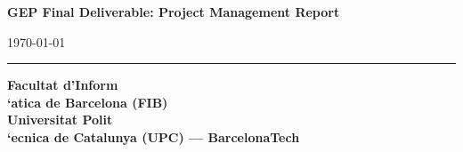 \documentclass[12pt, a4paper, twoside]{report}
\newcommand{\DocumentDate}{\today}
\begin{document}
\begin{titlepage}
  \begin{center}
    {\normalsize\bfseries GEP Final Deliverable: Project Management Report\par
      \vspace{0.3cm}
      \DocumentDate\par
    }
  \end{center}

  \vfill

  {\color{upcblue}\noindent\rule{\linewidth}{0.6pt}}
  \vspace{0.3cm}

  \begin{center}
    {\normalsize\bfseries
      Facultat d'Inform\\`atica de Barcelona (FIB)\\[2pt]
      Universitat Polit\\`ecnica de Catalunya (UPC) --- BarcelonaTech\par}
  \end{center}

  \restoregeometry
\end{titlepage}

\tableofcontents
\listoffigures
\listoftables

\DeclareRobustCommand{\loesource}[1]{\newline \textit{\small #1}}
\listoftheorems
\DeclareRobustCommand{\loesource}[1]{}

\clearpage
{}




%
%
%
%

\printbibliography[heading=bibintoc]
\end{document}
